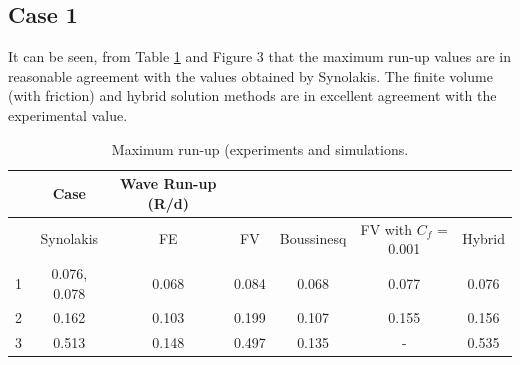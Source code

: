 \subsection{Case 1}

It can be seen, from Table \ref{tab:tests:runup} and Figure 3 that the maximum
run-up values are in reasonable agreement with the values obtained by Synolakis.
The finite volume (with friction) and hybrid solution methods are in excellent
agreement with the experimental value.

\begin{table}[H]
  \begin{center}
  \begin{tabular*}{.9\textwidth}{|*{7}{c|}}
\hline
  & Case          & Wave Run-up (R/d) & & & & \\
\hline
  & Synolakis    & FE    & FV    & Boussinesq & FV with $C_f$ = 0.001 & Hybrid \\
\hline
1 & 0.076, 0.078 & 0.068 & 0.084 & 0.068      & 0.077 & 0.076 \\
\hline
2 & 0.162        & 0.103 & 0.199 & 0.107      & 0.155 & 0.156 \\
\hline
3 & 0.513        & 0.148 & 0.497 & 0.135      & -     & 0.535 \\
\hline
  \end{tabular*}
  \end{center}
  \caption{Maximum run-up (experiments and simulations.}
  \label{tab:tests:runup}
\end{table}

